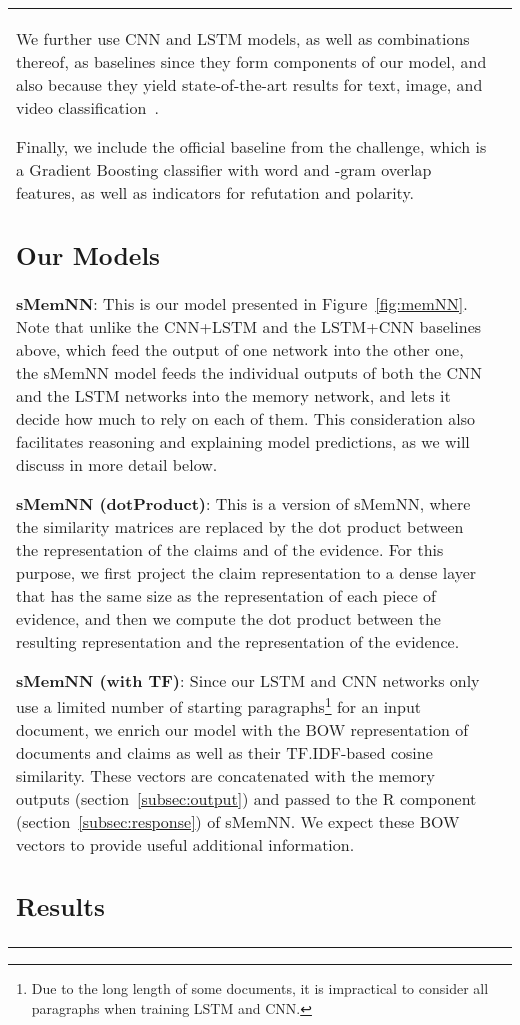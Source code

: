 \documentclass[11pt,a4paper]{article}
\begin{document}
\begin{table}
{\begin{tabularx}{1.15\linewidth}{|lX|}
We further use CNN and LSTM models, as well as combinations thereof, as baselines since they form components of our model, 
and also because they yield state-of-the-art results for text, image, and video classification~\cite{acl:TanSXZ16,cvpr:DonahueHGRVDS15,Zuo_2015_CVPR_Workshops,ICASSP:Sainath}. 

Finally, we include the official baseline from the challenge, which is a Gradient Boosting classifier with word and -gram overlap features, as well as indicators for refutation and polarity.

\subsection{Our Models}

{\bf sMemNN}: This is our model presented in Figure~\ref{fig:memNN}. Note that unlike the CNN+LSTM and the LSTM+CNN baselines above, which feed the output of one network into the other one, the sMemNN model feeds the individual outputs of both the CNN and the LSTM networks into the memory network, and lets it decide how much to rely on each of them. This consideration also facilitates reasoning and explaining model predictions, as we will discuss in more detail below. 

{\bf sMemNN (dotProduct)}:  
This is a version of sMemNN, where the similarity matrices are replaced by the dot product between the representation of the claims and of the evidence. For this purpose, we first project the claim representation to a dense layer that has the same size as the representation of each piece of evidence, and then we compute the dot product between the resulting representation and the representation of the evidence.

{\bf sMemNN (with TF)}:  
Since our LSTM and CNN networks only use a limited number of starting paragraphs\footnote{Due to the long length of some documents, it is impractical to consider all paragraphs when training LSTM and CNN.} for an input document, we enrich our model with the BOW representation of documents and claims as well as their TF.IDF-based cosine similarity. These vectors are concatenated with the memory outputs (section~\ref{subsec:output}) and passed to the R component (section~\ref{subsec:response}) of sMemNN. We expect these BOW vectors to provide useful additional information.

\subsection{Results}


\end{tabularx}}
\end{table}
\end{document}
